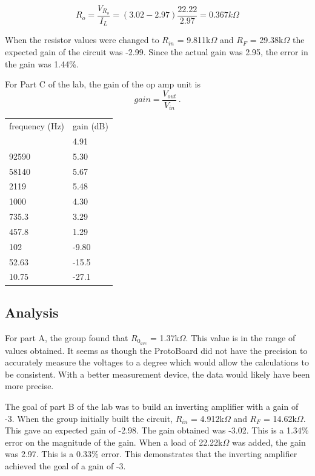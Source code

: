 \documentclass[twocolumn, amsmath]{revtex4}
\begin{document}
$$R_{o} =  \frac{V_{R_{o}}}{I_{L}} = (3.02 - 2.97)\frac{22.22}{2.97} = 0.367k\Omega$$

When the resistor values were changed to $R_{in}$ = 9.811k$\Omega$ and $R_{F}$ = 29.38k$\Omega$ the expected gain of the circuit was -2.99. Since the actual gain was 2.95, the error in the gain was 1.44\%. 

For Part C of the lab, the gain of the op amp unit is
$$gain = \frac{V_{out}}{V_{in}} \, .$$

\begin{center}
	\begin{ruledtabular}
    \begin{tabular}{ l l }
	frequency (Hz) & gain (dB) \\ \colrule
	102000 & 4.91 \\
	92590 & 5.30  \\
	58140 & 5.67 \\
	2119 & 5.48 \\
	1000 & 4.30 \\
	735.3 & 3.29 \\
	457.8 & 1.29 \\
	102 & -9.80 \\
	52.63 & -15.5 \\
	10.75 & -27.1 \\
\end{tabular}
    \end{ruledtabular}
\end{center}



\subsection{Analysis}
For part A, the group found that $R_{0_{ave}}$ = 1.37k$\Omega$. This value is in the range of values obtained. It seems as though the ProtoBoard did not have the precision to accurately measure the voltages to a degree which would allow the calculations to be consistent. With a better measurement device, the data would likely have been more precise.

The goal of part B of the lab was to build an inverting amplifier with a gain of -3. When the group initially built the circuit, $R_{in}$ = 4.912k$\Omega$ and $R_{F}$ = 14.62k$\Omega$. This gave an expected gain of -2.98. The gain obtained was -3.02. This is a 1.34\% error on the magnitude of the gain. When a load of 22.22k$\Omega$ was added, the gain was 2.97. This is a 0.33\% error. This demonstrates that the inverting amplifier achieved the goal of a gain of -3. 
\end{document}
